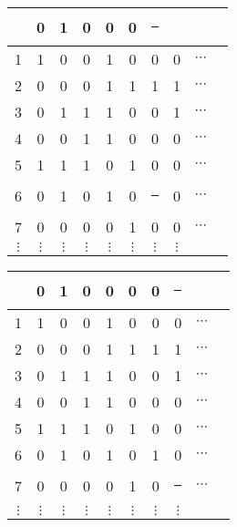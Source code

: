 \documentclass[compress,17pt]{beamer}
\newcommand\hl{\bgroup\markoverwith
    {\textcolor{yellow}{\rule[-.5ex]{.1pt}{2.5ex}}}\ULon}
\begin{document}
\begin{frame}
  \centering
  \begin{tabular}{ | c | c c c c c c c c c }
    \hline
    &  0 & 1 & 0 & 0 & 0 & \hl 0\\
    \hline

    1 & 1 & 0 & 0 & 1 & 0 & 0 & 0 & $\cdots$\\
    2 & 0 & 0 & 0 & 1 & 1 & 1 & 1 & $\cdots$\\
    3 & 0 & 1 & 1 & 1 & 0 & 0 & 1 & $\cdots$\\
    4 & 0 & 0 & 1 & 1 & 0 & 0 & 0 & $\cdots$\\
    5 & 1 & 1 & 1 & 0 & 1 & 0 & 0 & $\cdots$\\
    6 & 0 & 1 & 0 & 1 & 0 & \hl 1 & 0 & $\cdots$\\
    7 & 0 & 0 & 0 & 0 & 1 & 0 & 0 & $\cdots$\\
    $\vdots$ & $\vdots$ & $\vdots$ & $\vdots$ & $\vdots$ & $\vdots$ & $\vdots$ & $\vdots$ & \\
  \end{tabular}
\end{frame}

\begin{frame}
  \centering
  \begin{tabular}{ | c | c c c c c c c c c }
    \hline
    & 0 & 1 & 0 & 0 & 0 & 0 & \hl 1 \\
    \hline

    1 & 1 & 0 & 0 & 1 & 0 & 0 & 0 & $\cdots$\\
    2 & 0 & 0 & 0 & 1 & 1 & 1 & 1 & $\cdots$\\
    3 & 0 & 1 & 1 & 1 & 0 & 0 & 1 & $\cdots$\\
    4 & 0 & 0 & 1 & 1 & 0 & 0 & 0 & $\cdots$\\
    5 & 1 & 1 & 1 & 0 & 1 & 0 & 0 & $\cdots$\\
    6 & 0 & 1 & 0 & 1 & 0 & 1 & 0 & $\cdots$\\
    7 & 0 & 0 & 0 & 0 & 1 & 0 & \hl 0 & $\cdots$\\
    $\vdots$ & $\vdots$ & $\vdots$ & $\vdots$ & $\vdots$ & $\vdots$ & $\vdots$ & $\vdots$ & \\
  \end{tabular}
\end{frame}
\end{document}

